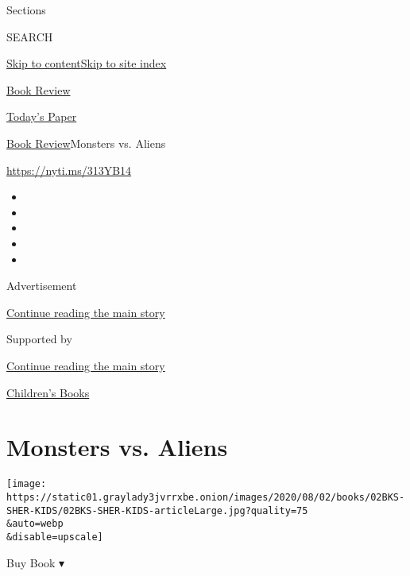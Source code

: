 Sections

SEARCH

\protect\hyperlink{site-content}{Skip to
content}\protect\hyperlink{site-index}{Skip to site index}

\href{https://www.nytimes3xbfgragh.onion/section/books/review}{Book
Review}

\href{https://myaccount.nytimes3xbfgragh.onion/auth/login?response_type=cookie\&client_id=vi}{}

\href{https://www.nytimes3xbfgragh.onion/section/todayspaper}{Today's
Paper}

\href{/section/books/review}{Book Review}\textbar{}Monsters vs. Aliens

\url{https://nyti.ms/313YB14}

\begin{itemize}
\item
\item
\item
\item
\item
\end{itemize}

Advertisement

\protect\hyperlink{after-top}{Continue reading the main story}

Supported by

\protect\hyperlink{after-sponsor}{Continue reading the main story}

\href{/column/childrens-books}{Children's Books}

\hypertarget{monsters-vs-aliens}{%
\section{Monsters vs. Aliens}\label{monsters-vs-aliens}}

\texttt{[image: https://static01.graylady3jvrrxbe.onion/images/2020/08/02/books/02BKS-SHER-KIDS/02BKS-SHER-KIDS-articleLarge.jpg?quality=75\\\&auto=webp\\\&disable=upscale]}

Buy Book ▾

